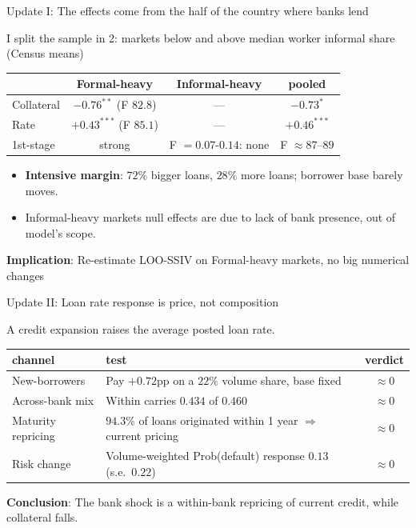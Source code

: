 \documentclass[11pt,aspectratio=169]{beamer}
\begin{document}
\begin{frame}{Update I: The effects come from the half of the country where banks lend}

I split the sample in 2: markets below and above median worker informal share (Census means)

\medskip
\begin{center}
\renewcommand{\arraystretch}{1.25}\footnotesize
\begin{tabular}{lccc}
\toprule
 & Formal-heavy & Informal-heavy & pooled \\
\midrule
Collateral  & $-0.76^{**}$\; (F $82.8$) & --- &
 $-0.73^{*}$ \\
Rate & $+0.43^{***}$ (F $85.1$) & --- &
 $+0.46^{***}$ \\
1st-stage & strong & F $= 0.07$-$0.14$: none & F $\approx 87$--$89$ \\
\bottomrule
\end{tabular}
\end{center}

\bigskip
\begin{itemize}
  \item \textbf{Intensive margin}: $72\%$ bigger loans, $28\%$ more loans; borrower base barely moves.
  \item Informal-heavy markets null effects are due to lack of bank presence, out of model's scope.
\end{itemize}

\medskip
\textbf{Implication}: Re-estimate LOO-SSIV on Formal-heavy markets, no big numerical changes

\end{frame}
 

\begin{frame}{Update II: Loan rate response is price, not composition}

A credit expansion raises the average posted loan rate.
\medskip
\begin{center}
\renewcommand{\arraystretch}{1.25}\footnotesize
\begin{tabular}{lp{}c}
\toprule
channel & test & verdict \\
\midrule
New-borrowers & Pay $+0.72$pp on a $22\%$ volume
 share, base fixed & $\approx 0$ \\
Across-bank mix & Within carries $0.434$ of $0.460$ &
 $\approx 0$ \\
Maturity repricing & $94.3\%$ of loans originated within 1
 year $\Rightarrow$ current pricing & $\approx 0$ \\
Risk change & Volume-weighted Prob(default) response $0.13$ (s.e.\ $0.22$) & $\approx 0$ \\
\bottomrule
\end{tabular}
\end{center}
\bigskip
\textbf{Conclusion}: The bank shock is a within-bank repricing of current credit, while collateral falls.
\end{frame}
 
\end{document}
